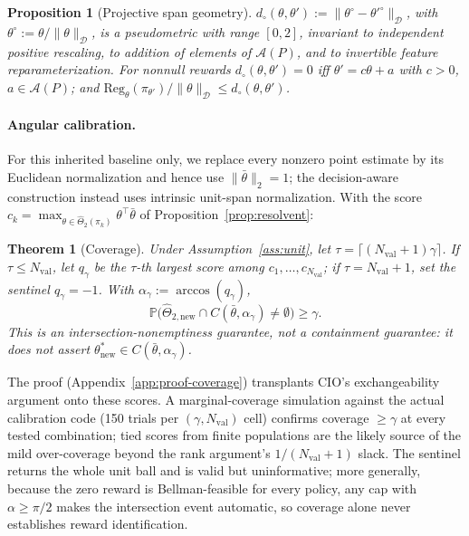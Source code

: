 \documentclass{article}
\newtheorem{theorem}{Theorem}
\newtheorem{proposition}{Proposition}
\newcommand{\Dnorm}[1]{\|#1\|_{\mathcal D}}
\begin{document}
\begin{proposition}[Projective span geometry]
\label{prop:projective}
$d_\circ(\theta,\theta'):=\Dnorm{\theta^\circ-\theta'^\circ}$, with
$\theta^\circ:=\theta/\Dnorm{\theta}$, is a pseudometric with range $[0,2]$,
invariant to independent positive rescaling, to addition of elements of
$\mathcal A(P)$, and to invertible feature reparameterization. For nonnull
rewards $d_\circ(\theta,\theta')=0$ iff $\theta'=c\theta+a$ with $c>0$,
$a\in\mathcal A(P)$; and
$\mathrm{Reg}_{\theta}(\pi_{\theta'})/\Dnorm{\theta}\le d_\circ(\theta,\theta')$.
\end{proposition}

\paragraph{Angular calibration.} For this inherited baseline only, we replace every nonzero point estimate by
its Euclidean normalization and hence use $\|\bar\theta\|_2=1$; the
decision-aware construction instead uses intrinsic unit-span normalization. With the
score $c_k=\max_{\theta\in\hat\Theta_2(\pi_k)}\theta^\top\bar\theta$ of
Proposition~\ref{prop:resolvent}:

\begin{theorem}[Coverage]
\label{thm:coverage}
Under Assumption~\ref{ass:unit}, let $\tau=\lceil(N_{\mathrm{val}}+1)\gamma\rceil$.
If $\tau\le N_{\mathrm{val}}$, let $q_\gamma$ be the $\tau$-th \emph{largest}
score among $c_1,\dots,c_{N_{\mathrm{val}}}$; if $\tau=N_{\mathrm{val}}+1$, set
the sentinel $q_\gamma=-1$. With $\alpha_\gamma:=\arccos(q_\gamma)$,
\[
\mathbb P\big(\hat\Theta_{2,\mathrm{new}}\cap C(\bar\theta,\alpha_\gamma)\ne\emptyset\big)\ge\gamma .
\]
This is an intersection-nonemptiness guarantee, not a containment guarantee: it
does not assert $\theta^*_{\mathrm{new}}\in C(\bar\theta,\alpha_\gamma)$.
\end{theorem}

The proof (Appendix~\ref{app:proof-coverage}) transplants CIO's exchangeability
argument onto these scores. A marginal-coverage simulation against the actual
calibration code (150 trials per $(\gamma,N_{\mathrm{val}})$ cell) confirms
coverage $\ge\gamma$ at every tested combination; tied scores from finite
populations are the likely source of the mild over-coverage beyond the rank
argument's $1/(N_{\mathrm{val}}+1)$ slack. The sentinel returns the whole unit
ball and is valid but uninformative; more generally, because the zero reward is
Bellman-feasible for every policy, any cap with $\alpha\ge\pi/2$ makes the
intersection event automatic, so coverage alone never establishes reward
identification.
\end{document}
